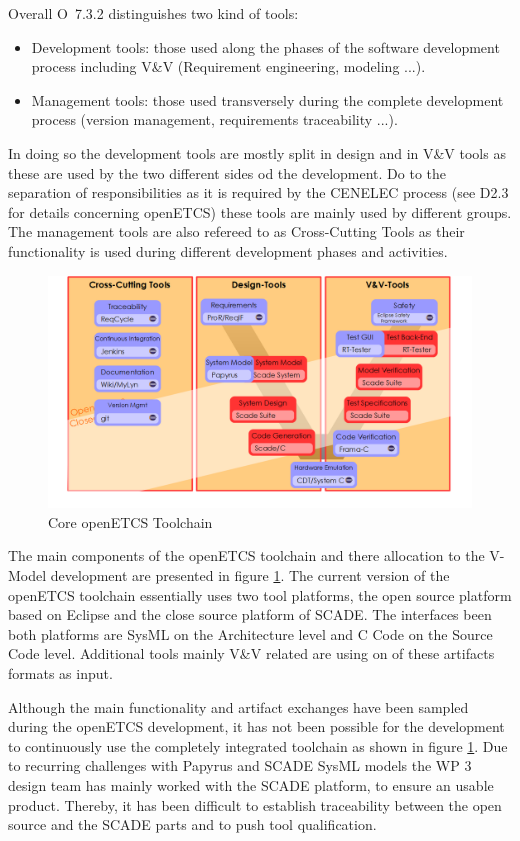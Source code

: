 \documentclass{template/openetcs_report}
\begin{document}
Overall O~7.3.2 distinguishes two kind of tools:
\begin{itemize}
\item Development tools: those used along the phases of the software development process including V\&V  (Requirement engineering, modeling ...).
\item Management tools: those used transversely during the complete development process (version
management, requirements traceability ...).
\end{itemize}

In doing so the development tools are mostly split in design and in V\&V tools as these are used by the two different sides od the development. Do to the separation of responsibilities as it is required by the CENELEC process (see D2.3 for details concerning openETCS) these tools are mainly used by different groups. The management tools are also refereed to as Cross-Cutting Tools as their functionality is used during different development phases and activities.

\begin{figure}[h]
\centering
\includegraphics[width=0.9\linewidth]{./images/Toolchain-New-Version-V-Model-Nov-2015}
\caption{Core openETCS Toolchain}
\label{fig:Toolchain-New}
\end{figure}

The main components of the openETCS toolchain and there allocation to the V-Model development are presented in figure \ref{fig:Toolchain-New}.  The current version of the openETCS toolchain essentially uses two tool platforms, the open source platform based on Eclipse and the close source platform of SCADE. The interfaces been both platforms are SysML on the Architecture level and C Code on the Source Code level. Additional tools mainly V\&V related are using on of these artifacts formats as input. 

Although the main functionality and artifact exchanges have been sampled during the openETCS development, it has not been possible for the development to continuously use the completely integrated toolchain as shown in figure \ref{fig:Toolchain-New}. Due to recurring challenges with Papyrus and SCADE SysML models the WP 3 design team has mainly worked with the SCADE platform, to ensure an usable product. Thereby, it has been difficult to establish traceability between the open source and the SCADE parts and to push tool qualification.
\end{document}

